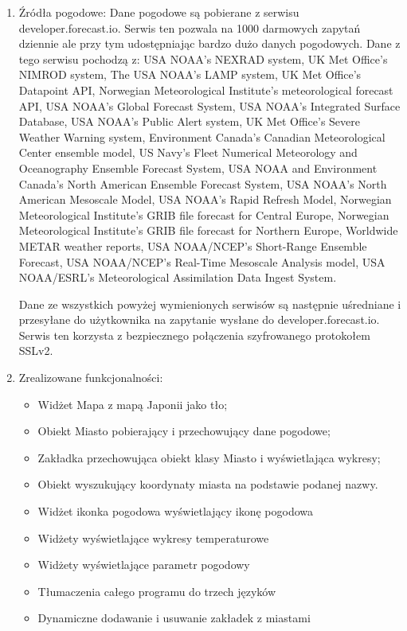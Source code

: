 \documentclass[a4paper]{article}
\begin{document}
\begin{enumerate}
\item Źródła pogodowe:
Dane pogodowe są pobierane z serwisu developer.forecast.io. Serwis ten pozwala na 1000 darmowych zapytań dziennie ale przy tym udostępniając bardzo dużo danych pogodowych. Dane z tego serwisu pochodzą z: USA NOAA’s NEXRAD system, UK Met Office’s NIMROD system, The USA NOAA’s LAMP system, UK Met Office’s Datapoint API, Norwegian Meteorological Institute’s meteorological forecast API, USA NOAA’s Global Forecast System, USA NOAA’s Integrated Surface Database, USA NOAA’s Public Alert system, UK Met Office’s Severe Weather Warning system, Environment Canada’s Canadian Meteorological Center ensemble model, US Navy’s Fleet Numerical Meteorology and Oceanography Ensemble Forecast System, USA NOAA and Environment Canada’s North American Ensemble Forecast System, USA NOAA’s North American Mesoscale Model, USA NOAA’s Rapid Refresh Model, Norwegian Meteorological Institute’s GRIB file forecast for Central Europe, Norwegian Meteorological Institute’s GRIB file forecast for Northern Europe, Worldwide METAR weather reports, USA NOAA/NCEP’s Short-Range Ensemble Forecast, USA NOAA/NCEP’s Real-Time Mesoscale Analysis model, USA NOAA/ESRL’s Meteorological Assimilation Data Ingest System.

Dane ze wszystkich powyżej wymienionych serwisów są następnie uśredniane i przesyłane do użytkownika na zapytanie wysłane do developer.forecast.io. Serwis ten korzysta z bezpiecznego połączenia szyfrowanego protokołem SSLv2.


\item Zrealizowane funkcjonalności:
\begin{itemize}
\item Widżet Mapa z mapą Japonii jako tło;
\item Obiekt Miasto pobierający i przechowujący dane pogodowe;
\item Zakładka przechowująca obiekt klasy Miasto i wyświetlająca wykresy;
\item Obiekt wyszukujący koordynaty miasta na podstawie podanej nazwy.
\item Widżet ikonka pogodowa wyświetlający ikonę pogodowa
\item Widżety wyświetlające wykresy temperaturowe
\item Widżety wyświetlające parametr pogodowy
\item Tłumaczenia całego programu do trzech języków
\item Dynamiczne dodawanie i usuwanie zakładek z miastami
\end{itemize}


\end{enumerate}
\end{document}
